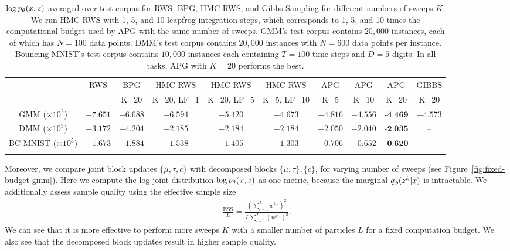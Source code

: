 \documentclass{article}
\theoremstyle{definition}
\begin{document}
\begin{table}[t!]
\centering
\caption{$\log p_\theta (x, z)$ averaged over test corpus for RWS, BPG, HMC-RWS, and Gibbs Sampling for different numbers of sweeps $K$.
We run HMC-RWS with 1, 5, and 10 leapfrog integration steps, which corresponds to 1, 5, and 10 times the computational budget used by APG with the same number of sweeps.
GMM's test corpus contains $20,000$ instances, each of which has $N=100$ data points. DMM's test corpus contains $20,000$ instances with $N=600$ data points per instance. Bouncing MNIST's test corpus contains $10,000$ instances each containing $T=100$ time steps and $D=5$ digits.
In all tasks, APG with $K=20$ performs the best.}
\vspace{0.5em}
\addtolength{\tabcolsep}{-2pt} 
\begin{tabularx}{\textwidth}{cccccccccc}
    \toprule
     & RWS & BPG & HMC-RWS & HMC-RWS & HMC-RWS & APG & APG & APG & GIBBS \\
     & & K=20 & K=20, LF=1 & K=20, LF=5 & K=5, LF=10 & K=5 & K=10 & K=20 & K=20 \\
    \midrule
    GMM ($\times10^2$)& $-7.651$ & $-6.688$ & $-6.594$ & $-5.420$ & $-4.673$ & $-4.816$ & $-4.556$ & $\textbf{-4.469}$ & $-4.573$ \\
    DMM ($\times10^3$) & $-3.172$ & $-4.204$ & $-2.185$ & $-2.184$ & $-2.184$ & $-2.050$ & $-2.040$ & $\textbf{-2.035}$ & -- \\
    BC-MNIST ($\times10^5$) & $-1.673$ & $-1.884$ & $-1.538$ & $-1.405$ & $-1.303$ & $-0.706$ & $-0.652$ & $\textbf{-0.620}$ & --\\
    \bottomrule
    \vspace{-1em}
\end{tabularx}
\label{table:log-joint-all}
\end{table}

Moreover, we compare joint block updates $\{\mu, \tau, c\}$ with decomposed blocks $\{\mu, \tau\}, \{c\}$, for varying number of sweeps (see Figure~\ref{fig:fixed-budget-gmm}). Here we compute the log joint distribution $\log p_\theta(x, z)$ as one metric, because the marginal $q_\phi(z^k | x)$ is intractable.%
We additionally assess sample quality using the effective sample size
\vspace{-0.5em}
\begin{align*}
    \frac{\text{ESS}}{L} 
    = 
    \frac{(\sum_{l=1}^L w^{k,l})^2}
         {L \sum_{l=1}^L (w^{k,l})^2}
    .
\end{align*}
We can see that it is more effective to perform more sweeps $K$ with a smaller number of particles $L$ for a fixed computation budget. We also see that the decomposed block updates result in higher sample quality.
\end{document}
